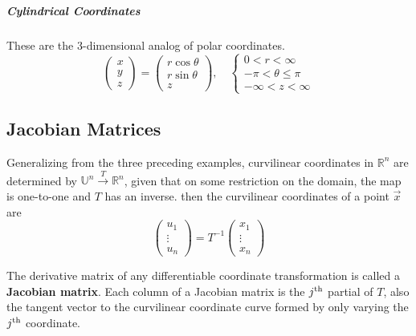 \documentclass[11pt]{article}
\begin{document}
	\subparagraph{Cylindrical Coordinates} These are the 3-dimensional analog of polar coordinates.
		\begin{equation}
			\begin{pmatrix}
				x\\y\\z
			\end{pmatrix}
			= \begin{pmatrix}
				r\cos\theta\\
				r\sin\theta\\
				z
			\end{pmatrix}, \quad
			\left\lbrace
			\begin{matrix}
				0 < r < \infty\\
				-\pi < \theta \leq \pi\\
				-\infty < z < \infty
			\end{matrix}
			\right.
		\end{equation}
		
	\subsection{Jacobian Matrices}
		Generalizing from the three preceding examples, curvilinear coordinates in $\mathbb{R}^n$ are determined by $\mathbb{U}^n \xrightarrow{T} \mathbb{R}^n$, given that on some restriction on the domain, the map is one-to-one and $T$ has an inverse. then the curvilinear coordinates of a point $\vec{x}$ are
		\begin{equation}
			\begin{pmatrix}
				u_1\\
				\vdots\\
				u_n
			\end{pmatrix}
			= T^{-1} \begin{pmatrix}
				x_1\\
				\vdots\\
				x_n
			\end{pmatrix}
		\end{equation}
		
		The derivative matrix of any differentiable coordinate transformation is called a \textbf{Jacobian matrix}. Each column of a Jacobian matrix is the $j\textsuperscript{th}$ partial of $T$, also the tangent vector to the curvilinear coordinate curve formed by only varying the $j\textsuperscript{th}$ coordinate. 
		
\end{document}
